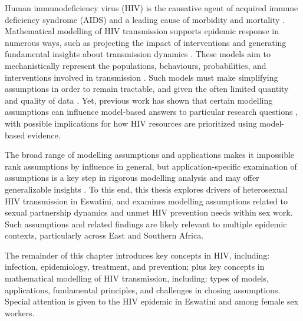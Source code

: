 Human immunodeficiency virus (HIV) is
the causative agent of acquired immune deficiency syndrome (AIDS)
and a leading cause of morbidity and mortality \cite{Maartens2014,GBD2019}.
Mathematical modelling of HIV transmission supports epidemic response in numerous ways, such as
projecting the impact of interventions \cite{Eaton2012} and
generating fundamental insights about transmission dynamics \cite{Garnett1993}.
These models aim to mechanistically represent
the populations, behaviours, probabilities, and interventions
involved in transmission \cite{Garnett2011}.
Such models must make simplifying assumptions in order to remain tractable,
and given the often limited quantity and quality of data \cite{Mishra2016,Garnett2011}.
Yet, previous work has shown that certain modelling assumptions can influence
model-based answers to particular research questions
\cite{Garnett1993,Hontelez2013,Mishra2016,Johnson2016mf,Bernard2017,Knight2020},
with possible implications for how HIV resources are prioritized using model-based evidence.
\par
The broad range of modelling assumptions and applications
makes it impossible rank assumptions by influence in general,
but application-specific examination of assumptions
is a key step in rigorous modelling analysis
and may offer generalizable insights \cite{Suen2017}.
To this end, this thesis explores drivers of heterosexual HIV transmission in Eswatini,
and examines modelling assumptions related to
sexual partnership dynamics and unmet HIV prevention needs within sex work.
Such assumptions and related findings are likely relevant to multiple epidemic contexts,
particularly across East and Southern Africa.
\par
The remainder of this chapter introduces key concepts in HIV, including:
infection, epidemiology, treatment, and prevention;
plus key concepts in mathematical modelling of HIV transmission, including:
types of models, applications, fundamental principles, and challenges in chosing assumptions.
Special attention is given to the HIV epidemic in Eswatini and among female sex workers.
